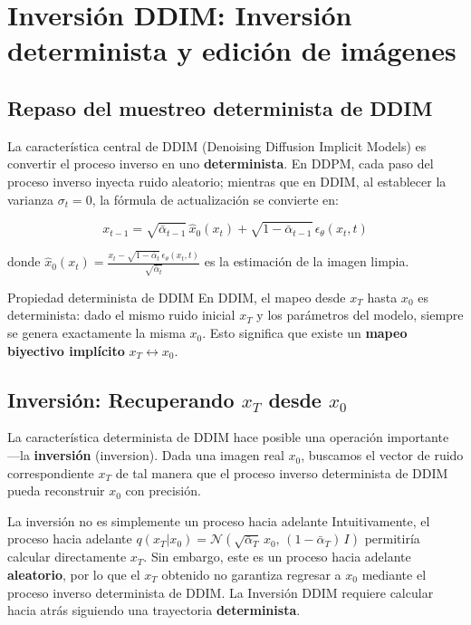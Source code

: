 \section{Inversión DDIM: Inversión determinista y edición de imágenes}

\subsection{Repaso del muestreo determinista de DDIM}

La característica central de DDIM (Denoising Diffusion Implicit Models) es convertir el proceso inverso en uno \textbf{determinista}. En DDPM, cada paso del proceso inverso inyecta ruido aleatorio; mientras que en DDIM, al establecer la varianza $\sigma_t = 0$, la fórmula de actualización se convierte en:

$$
x_{t-1} = \sqrt{\bar\alpha_{t-1}}\,\hat{x}_0(x_t) + \sqrt{1-\bar\alpha_{t-1}}\,\epsilon_\theta(x_t, t)
$$

donde $\hat{x}_0(x_t) = \frac{x_t - \sqrt{1-\bar\alpha_t}\,\epsilon_\theta(x_t, t)}{\sqrt{\bar\alpha_t}}$ es la estimación de la imagen limpia.

\begin{importantbox}{Propiedad determinista de DDIM}
En DDIM, el mapeo desde $x_T$ hasta $x_0$ es determinista: dado el mismo ruido inicial $x_T$ y los parámetros del modelo, siempre se genera exactamente la misma $x_0$. Esto significa que existe un \textbf{mapeo biyectivo implícito} $x_T \leftrightarrow x_0$.
\end{importantbox}

\subsection{Inversión: Recuperando $x_T$ desde $x_0$}

La característica determinista de DDIM hace posible una operación importante —la \textbf{inversión} (inversion). Dada una imagen real $x_0$, buscamos el vector de ruido correspondiente $x_T$ de tal manera que el proceso inverso determinista de DDIM pueda reconstruir $x_0$ con precisión.

\begin{warningbox}{La inversión no es simplemente un proceso hacia adelante}
Intuitivamente, el proceso hacia adelante $q(x_T|x_0) = \mathcal{N}(\sqrt{\bar\alpha_T}\,x_0,\, (1-\bar\alpha_T)\,I)$ permitiría calcular directamente $x_T$. Sin embargo, este es un proceso hacia adelante \textbf{aleatorio}, por lo que el $x_T$ obtenido no garantiza regresar a $x_0$ mediante el proceso inverso determinista de DDIM. La Inversión DDIM requiere calcular hacia atrás siguiendo una trayectoria \textbf{determinista}.
\end{warningbox}

